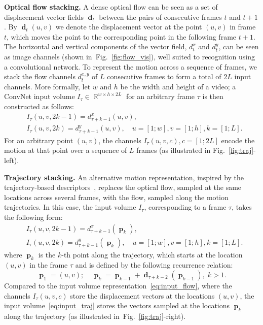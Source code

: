 \documentclass{article} \usepackage{nips14submit_e,times}
\newcommand{\figref}[1]{Fig.~\ref{#1}}
\DeclareMathOperator{\Rbb}{\mathbb{R}}
\DeclareMathOperator{\dvec}{\mathrm{\textbf{d}}}
\DeclareMathOperator{\pvec}{\mathrm{\textbf{p}}}
\begin{document}
\noindent\textbf{Optical flow stacking.}
A dense optical flow can be seen as a set of displacement vector fields $\dvec_t$ between the pairs of consecutive frames $t$ and $t+1$. 
By $\dvec_t(u,v)$ we denote the displacement vector at the point $(u,v)$ in frame $t$, which moves the point to the corresponding point in the following frame $t+1$. 
The horizontal and vertical components of the vector field, $d^x_t$ and $d^y_t$,  can be seen as image channels (shown in~\figref{fig:flow_vis}), well suited to
recognition using a convolutional network. 
To represent the motion across a sequence of frames, we stack the flow channels $d^{x,y}_t$ of $L$ consecutive frames to form a total of $2L$ input channels. 
More formally, let $w$ and $h$ be the width and height of a video;
a ConvNet input volume $I_{\tau} \in \Rbb^{w \times h \times 2L}$ for an arbitrary frame $\tau$ is then constructed as follows:
\begin{align}
\label{eq:input_flow}
&I_{\tau}(u,v,2k-1) = d^x_{\tau+k-1}(u,v), \\
\nonumber&I_{\tau}(u,v,2k) = d^y_{\tau+k-1}(u,v), \quad u=[1;w], v=[1;h], k=[1;L]. 
\end{align}
For an arbitrary point $(u,v)$, the channels $I_{\tau}(u,v,c), c=[1;2L]$ encode the motion at that point over a sequence of $L$ frames (as illustrated in \figref{fig:traj}-left).

\noindent\textbf{Trajectory stacking.}
An alternative motion representation, inspired by the trajectory-based descriptors~\cite{Wang11b}, replaces the optical flow, sampled at the same locations across several frames,
with the flow, sampled along the motion trajectories. In this case, the input volume $I_{\tau}$, corresponding to a frame $\tau$, takes the following form:
\begin{align}
\label{eq:input_traj}
&I_{\tau}(u,v,2k-1) = d^x_{\tau+k-1}(\pvec_k), \\
\nonumber&I_{\tau}(u,v,2k) = d^y_{\tau+k-1}(\pvec_k), \quad u=[1;w], v=[1;h], k=[1;L].
\end{align}
where $\pvec_k$ is the $k$-th point along the trajectory, which starts at the location $(u,v)$ in the frame $\tau$ and is defined by the following recurrence relation:
\[
\pvec_1 = (u,v); ~~~~~
\pvec_k = \pvec_{k-1} + \dvec_{\tau+k-2}(\pvec_{k-1}),\; k > 1.
\]
Compared to the input volume representation~\eqref{eq:input_flow},
where the channels $I_{\tau}(u,v,c)$ store the displacement vectors at
the locations $(u,v)$, the input volume~\eqref{eq:input_traj} stores
the vectors sampled at the locations $\pvec_k$ along the trajectory
(as illustrated in~\figref{fig:traj}-right).
\end{document}
